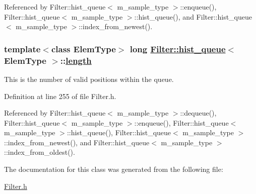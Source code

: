 Referenced by Filter::hist\_\-queue$<$ m\_\-sample\_\-type $>$::enqueue(), Filter::hist\_\-queue$<$ m\_\-sample\_\-type $>$::hist\_\-queue(), and Filter::hist\_\-queue$<$ m\_\-sample\_\-type $>$::index\_\-from\_\-newest().\hypertarget{classFilter_1_1hist__queue_r0}{
\subsubsection[length]{\setlength{\rightskip}{0pt plus 5cm}template$<$class Elem\-Type$>$ long \hyperlink{classFilter_1_1hist__queue}{Filter::hist\_\-queue}$<$ Elem\-Type $>$::\hyperlink{classFilter_1_1hist__queue_r0}{length}}}
\label{classFilter_1_1hist__queue_r0}


This is the number of valid positions within the queue. 

Definition at line 255 of file Filter.h.

Referenced by Filter::hist\_\-queue$<$ m\_\-sample\_\-type $>$::dequeue(), Filter::hist\_\-queue$<$ m\_\-sample\_\-type $>$::enqueue(), Filter::hist\_\-queue$<$ m\_\-sample\_\-type $>$::hist\_\-queue(), Filter::hist\_\-queue$<$ m\_\-sample\_\-type $>$::index\_\-from\_\-newest(), and Filter::hist\_\-queue$<$ m\_\-sample\_\-type $>$::index\_\-from\_\-oldest().

The documentation for this class was generated from the following file:\begin{CompactItemize}
\item 
\hyperlink{Filter_8h}{Filter.h}\end{CompactItemize}
